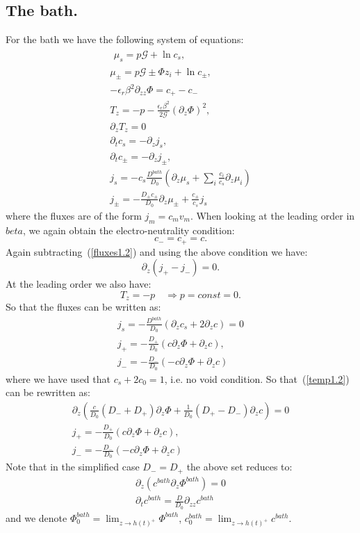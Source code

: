 \documentclass[12pt]{extarticle}
\begin{document}
\subsection{The bath.}
For the bath we have the following system of equations:
\begin{gather}
\begin{aligned}
\mu_s = p \mathcal{G} + \ln c_s, 
\end{aligned}\\[2.5mm]
\mu_\pm = p \mathcal{G} \pm \Phi z_i + \ln c_\pm ,\\
-\epsilon_r\beta^2\partial_{zz} \Phi = c_+-c_-\, \\
T_z= -p-\frac{\epsilon_r\beta^2 }{2\mathcal{G}} (\partial_z \Phi)^2,\\
\partial_z T_z=0\\
\partial_t c_s = - \partial_z j_s,\\
\partial_t c_\pm = -\partial_z j_\pm,\label{fluxes1.2}\\
j_s =-c_s \frac{D^{bath}}{D_0}  \left(\partial_z\mu_s +\sum_i \frac{c_i}{c_s} \partial_z \mu_i\right)\\
j_\pm= - \frac{D_\pm c_\pm}{D_0}\partial_z \mu_\pm +  \frac{c_\pm}{c_s}j_s
\end{gather}
where the fluxes are of the form $j_m=c_m v_m$.
When looking at the leading order in $beta$, we again obtain the electro-neutrality condition:
\begin{equation}
c_-=c_+=c.
\end{equation}
Again subtracting~(\ref{fluxes1.2}) and using the above condition we have:
\begin{equation}
\partial_z(j_+-j_-)=0.\label{temp1.2}
\end{equation}
At the leading order we also have:
\begin{equation}
T_z =-p \quad \Rightarrow p=const=0.
\end{equation}
So that the fluxes can be written as:
\begin{gather}
j_s =-\frac{D^{bath}}{D_0}  \left(\partial_zc_s + 2 \partial_z c\right)=0\\
j_+= - \frac{D_+}{D_0}\left(c\partial_z\Phi + \partial_z c\right),\\
j_-= - \frac{D_-}{D_0}\left(-c\partial_z\Phi + \partial_z c\right)
\end{gather}
where we have used that $c_s+2c_0=1$, i.e. no void condition.
So that~(\ref{temp1.2}) can be rewritten as:
\begin{gather}
\partial_z\left(\frac{c}{D_0}(D_-+D_+)\partial_z\Phi+\frac{1}{D_0}(D_+-D_-)\partial_zc\right)=0\\
j_+= - \frac{D_+}{D_0}\left(c\partial_z\Phi + \partial_z c\right),\\
j_-= - \frac{D_-}{D_0}\left(-c\partial_z\Phi + \partial_z c\right)
\end{gather}
Note that in the simplified case $D_-=D_+$ the above set reduces to:
\begin{gather}
\partial_z\left(c^{bath}\partial_z\Phi^{bath}\right)=0\\
\partial_t c^{bath} = \frac{D}{D_0} \partial_{zz} c^{bath}
\end{gather}
and we denote $\Phi^{bath}_0=\lim_{z\rightarrow h(t)^+} \Phi^{bath}$, $c^{bath}_0=\lim_{z\rightarrow h(t)^+} c^{bath}$.
\end{document}
